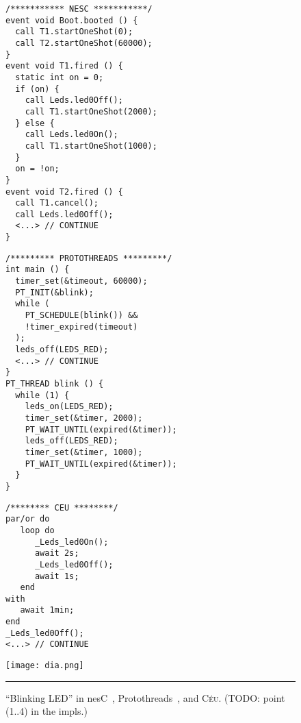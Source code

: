 \documentclass[10pt]{sensys-proc}
\newcommand{\CEU}{\textsc{C\'{e}u}\xspace}
\begin{document}
\begin{figure*}[!t]
\begin{minipage}[t]{0.24\linewidth}
{\small
\begin{Verbatim}
/*********** NESC ***********/
event void Boot.booted () {
  call T1.startOneShot(0);
  call T2.startOneShot(60000);
}
event void T1.fired () {
  static int on = 0;
  if (on) {
    call Leds.led0Off();
    call T1.startOneShot(2000);
  } else {
    call Leds.led0On();
    call T1.startOneShot(1000);
  }
  on = !on;
}
event void T2.fired () {
  call T1.cancel();
  call Leds.led0Off();
  <...> // CONTINUE
}
\end{Verbatim}
}
\end{minipage}
%
\hfill \vrule \hfill
\hspace{0.0cm}
%
\begin{minipage}[t]{0.28\linewidth}
{\small
\begin{verbatim}
/********* PROTOTHREADS *********/
int main () {
  timer_set(&timeout, 60000);
  PT_INIT(&blink);
  while (
    PT_SCHEDULE(blink()) &&
    !timer_expired(timeout)
  );
  leds_off(LEDS_RED);
  <...> // CONTINUE
}
PT_THREAD blink () {
  while (1) {
    leds_on(LEDS_RED);
    timer_set(&timer, 2000);
    PT_WAIT_UNTIL(expired(&timer));
    leds_off(LEDS_RED);
    timer_set(&timer, 1000);
    PT_WAIT_UNTIL(expired(&timer));
  }
}
\end{verbatim}
}
\end{minipage}
%
\hfill \vrule \hfill
\hspace{0.0cm}
%
\begin{minipage}[t]{0.18\linewidth}
{\small
\begin{verbatim}
/******** CEU ********/
par/or do
   loop do
      _Leds_led0On();
      await 2s;
      _Leds_led0Off();
      await 1s;
   end
with
   await 1min;
end
_Leds_led0Off();
<...> // CONTINUE
\end{verbatim}
}
\end{minipage}
%
\hfill \vrule \hfill
\hspace{0.0cm}
%
\begin{minipage}[t]{0.15\linewidth}
\vspace{0pt}
\centering
\texttt{[image: dia.png]}
\end{minipage}
%
\hspace{0.0cm}
%
\rule{18cm}{0.37pt}
\caption{ ``Blinking LED'' in
    nesC~\cite{wsn.nesc},
    Protothreads~\cite{wsn.protothreads},
    and \CEU.
    (TODO: point (1..4) in the impls.)
\label{lst.all}
}
\end{figure*}
\end{document}
